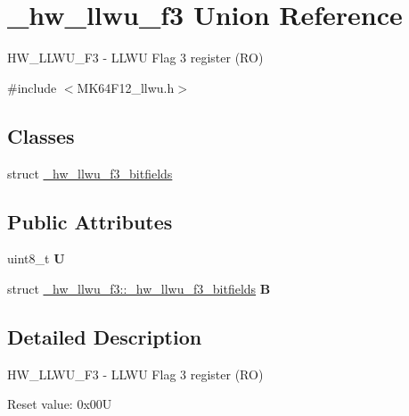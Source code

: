 \hypertarget{union__hw__llwu__f3}{}\section{\+\_\+hw\+\_\+llwu\+\_\+f3 Union Reference}
\label{union__hw__llwu__f3}


H\+W\+\_\+\+L\+L\+W\+U\+\_\+\+F3 -\/ L\+L\+WU Flag 3 register (RO)  




{\ttfamily \#include $<$M\+K64\+F12\+\_\+llwu.\+h$>$}

\subsection*{Classes}
\begin{DoxyCompactItemize}
\item 
struct \hyperlink{struct__hw__llwu__f3_1_1__hw__llwu__f3__bitfields}{\+\_\+hw\+\_\+llwu\+\_\+f3\+\_\+bitfields}
\end{DoxyCompactItemize}
\subsection*{Public Attributes}
\begin{DoxyCompactItemize}
\item 
uint8\+\_\+t {\bfseries U}\hypertarget{union__hw__llwu__f3_af0e452adcb2fd490b3146d372cf2f70b}{}\label{union__hw__llwu__f3_af0e452adcb2fd490b3146d372cf2f70b}

\item 
struct \hyperlink{struct__hw__llwu__f3_1_1__hw__llwu__f3__bitfields}{\+\_\+hw\+\_\+llwu\+\_\+f3\+::\+\_\+hw\+\_\+llwu\+\_\+f3\+\_\+bitfields} {\bfseries B}\hypertarget{union__hw__llwu__f3_a768a7dc6d16a000f57d161f2f02b2f3d}{}\label{union__hw__llwu__f3_a768a7dc6d16a000f57d161f2f02b2f3d}

\end{DoxyCompactItemize}


\subsection{Detailed Description}
H\+W\+\_\+\+L\+L\+W\+U\+\_\+\+F3 -\/ L\+L\+WU Flag 3 register (RO) 

Reset value\+: 0x00U


